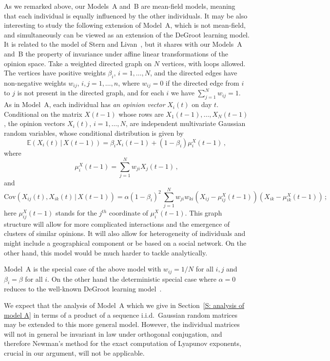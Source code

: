 \documentclass[12pt]{article}
\newcommand{\1}{\mathbf{1}}
\begin{document}
As we remarked above, our Models~A and~B are mean-field models, meaning that each individual is equally influenced by the other individuals. It may be also  interesting to study the following extension of Model~A, which is not mean-field, and simultaneously can be viewed as an extension of the DeGroot learning model. It is related to the model of Stern and Livan~\cite{SternLivan}, but it shares with our Models~A and~B the property of invariance under affine linear transformations of the opinion space. Take a weighted directed graph on $N$ vertices, with loops allowed. The vertices have positive weights $\beta_i$, $i=1, \dots, N$, and the directed edges have non-negative weights $w_{ij}$, $i, j  = 1,\dots,n$, where $w_{ij} = 0$ if the directed edge from $i$ to $j$ is not present in the directed graph, and for each $i$ we have $\sum_{j=1}^N w_{ij} =1$. As in Model~A, each individual has {\it an opinion vector} $X_i(t)$ on day $t$. Conditional on the matrix $X(t-1)$ whose rows are $X_1(t-1), \dots, X_N(t-1)$, the opinion vectors $X_i(t)$, $i=1, \dots, N$, are independent multivariate Gaussian random variables, whose conditional distribution is given by 
$$ 
\mathbb{E}(X_i(t) \,|\, X(t-1)) =  \beta_i X_i(t-1) + (1-\beta_i)\mu_i^X(t-1)\,,
$$
where 
$$
\mu_i^X(t-1) = 
\sum_{j=1}^N w_{ji}X_{j}(t-1) \,, 
$$
and
$$ 
\mathrm{Cov}(X_{ij}(t),X_{ik}(t) \,|\,X(t-1)) =  \alpha (1-\beta_i)^2 \,\sum_{j=1}^N w_{ji} w_{ki} (X_{ij} - \mu_{ij}^X(t-1))(X_{ik} - \mu_{ik}^X(t-1))\,;
$$
here $\mu_{ij}^X(t-1)$ stands for the $j^{th}$ coordinate of $\mu_i^X(t-1)$. This graph structure will allow for more complicated interactions and the emergence of clusters of similar opinions. It will also allow for heterogeneity of individuals and might include a geographical component or be based on a social network. On the other hand, this model would be much harder to tackle analytically.

Model~A is the special case of the above model with $w_{ij} = 1/N$ for all $i,j$ and $\beta_i = \beta$ for all $i$.  On the other hand the deterministic special case where $\alpha=0$ reduces to the well-known DeGroot learning model~\cite{DeGroot}.

We expect that the analysis of Model~A which we give in Section~\ref{S: analysis of model A} in terms of a product of a sequence i.i.d.~Gaussian random matrices may be extended to this more general model. However, the individual matrices will not in general be invariant in law under orthogonal conjugation, and therefore Newman's method for the exact computation of Lyapunov exponents, crucial in our argument, will not be applicable.
\end{document}
